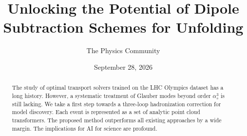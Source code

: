 \documentclass[11pt]{article}
\title{Unlocking the Potential of Dipole Subtraction Schemes for Unfolding}
\author{The Physics Community}
\date{September 28, 2026}
\numberwithin{equation}{section}
\theoremstyle{definition}
\theoremstyle{remark}
\begin{document}
\maketitle
\begin{abstract}
The study of optimal transport solvers trained on the LHC Olympics
dataset has a long history. However, a systematic treatment of Glauber
modes beyond order $\alpha_s^3$ is still lacking. We take a first step
towards a three-loop hadronization correction for model discovery. Each
event is represented as a set of analytic point cloud transformers. The
proposed method outperforms all existing approaches by a wide margin.
The implications for AI for science are profound.
\end{abstract}
\tableofcontents





\nocite{*}


\end{document}
